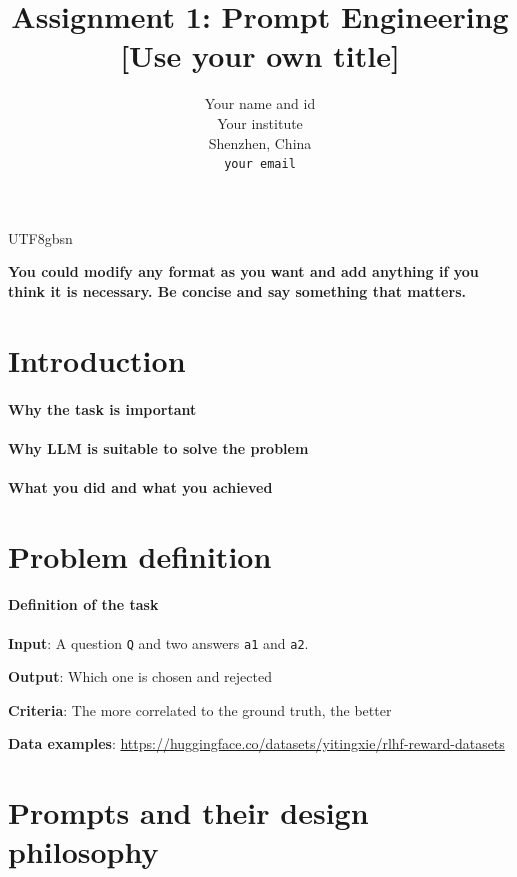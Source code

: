 \documentclass{article}%
\title{Assignment 1: Prompt Engineering [Use your own title] }
\author{Your name and id\\
Your institute\\
Shenzhen, China\\
\texttt{your email}\\
}
\begin{document}
\begin{CJK}{UTF8}{gbsn}
\maketitle

\textbf{ You could modify any format as you want and add anything if you think it is necessary.  Be concise and say something that matters.
}


\section{Introduction}


\paragraph{Why the task is important} \lipsum[1]

\paragraph{Why LLM is suitable to solve the problem} \lipsum[2]

\paragraph{What you did and what you achieved} \lipsum[3]


\section{Problem definition}

\paragraph{Definition of the task} \lipsum[3]

\textbf{Input}: A question {\tt Q} and two answers {\tt a1} and {\tt a2}.

\textbf{Output}: Which one is chosen and rejected

\textbf{Criteria}: The more correlated to the ground truth, the better

\textbf{Data examples}:  \url{https://huggingface.co/datasets/yitingxie/rlhf-reward-datasets}


\section{Prompts and their design philosophy}



\end{CJK}
\end{document}
